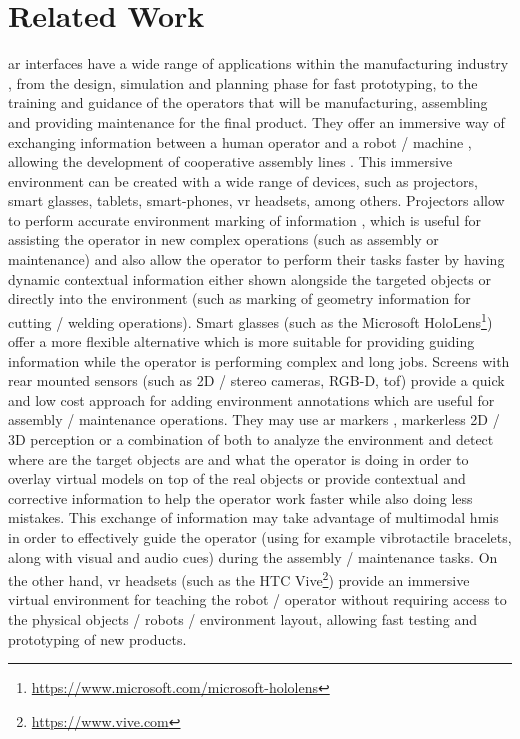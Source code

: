 \section{Related Work}\label{sec:related-work}

\gls{ar} interfaces \cite{Bimber2005} have a wide range of applications within the manufacturing industry \cite{Nee2012,Wang2016}, from the design, simulation and planning phase for fast prototyping, to the training and guidance \cite{Webel2011} of the operators that will be manufacturing, assembling and providing maintenance for the final product. They offer an immersive way of exchanging information between a human operator and a robot / machine \cite{Michalos2016}, allowing the development of cooperative assembly lines \cite{Lenz2011}. This immersive environment can be created with a wide range of devices, such as projectors, smart glasses, tablets, smart-phones, \gls{vr} headsets, among others. Projectors allow to perform accurate environment marking of information \cite{Fujimoto2014}, which is useful for assisting the operator in new complex operations (such as assembly or maintenance) and also allow the operator to perform their tasks faster by having dynamic contextual information either shown alongside the targeted objects or directly into the environment (such as marking of geometry information for cutting / welding operations). Smart glasses (such as the Microsoft HoloLens\footnote{\url{https://www.microsoft.com/microsoft-hololens}}) offer a more flexible alternative which is more suitable for providing guiding information while the operator is performing complex and long jobs. Screens with rear mounted sensors (such as 2D / stereo cameras, RGB-D, \gls{tof}) provide a quick and low cost approach for adding environment annotations which are useful for assembly / maintenance operations. They may use \gls{ar} markers \cite{Siltanen2012}, markerless 2D / 3D perception \cite{Andreopoulos2013,Guo2014} or a combination of both \cite{Wang2009} to analyze the environment and detect where are the target objects are and what the operator is doing \cite{Bannat2008} in order to overlay virtual models on top of the real objects or provide contextual and corrective information to help the operator work faster while also doing less mistakes. This exchange of information may take advantage of multimodal \glspl{hmi} \cite{Webel2013} in order to effectively guide the operator (using for example vibrotactile bracelets, along with visual and audio cues) during the assembly / maintenance tasks. On the other hand, \gls{vr} headsets (such as the HTC Vive\footnote{\url{https://www.vive.com}}) provide an immersive virtual environment for teaching the robot / operator without requiring access to the physical objects / robots / environment layout, allowing fast testing and prototyping of new products.

